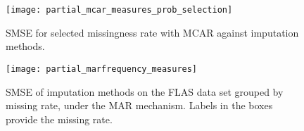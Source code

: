 \begin{figure}
  \centering
  \texttt{[image: partial\_mcar\_measures\_prob\_selection]}
  \caption{SMSE for selected missingness rate with MCAR
    against imputation methods.}
  \label{fig:mse:mcar}
\end{figure}


\begin{figure}
  \centering
  \texttt{[image: partial\_marfrequency\_measures]}
  \caption{SMSE of imputation methods on the FLAS data set grouped by missing
    rate, under the MAR mechanism. Labels in the boxes provide the missing
    rate.}
  \label{fig:mse:mar}
\end{figure}



